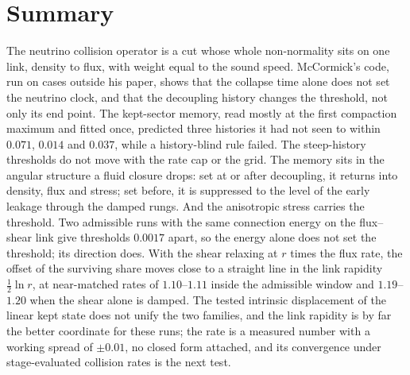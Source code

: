 \documentclass[11pt]{article}
\begin{document}
\section{Summary}

The neutrino collision operator is a cut whose whole non-normality sits on one link, density to flux, with weight equal to the sound speed. McCormick's code, run on cases outside his paper, shows that the collapse time alone does not set the neutrino clock, and that the decoupling history changes the threshold, not only its end point. The kept-sector memory, read mostly at the first compaction maximum and fitted once, predicted three histories it had not seen to within $0.071$, $0.014$ and $0.037$, while a history-blind rule failed. The steep-history thresholds do not move with the rate cap or the grid. The memory sits in the angular structure a fluid closure drops: set at or after decoupling, it returns into density, flux and stress; set before, it is suppressed to the level of the early leakage through the damped rungs. And the anisotropic stress carries the threshold. Two admissible runs with the same connection energy on the flux--shear link give thresholds $0.0017$ apart, so the energy alone does not set the threshold; its direction does. With the shear relaxing at $r$ times the flux rate, the offset of the surviving share moves close to a straight line in the link rapidity $\tfrac12\ln r$, at near-matched rates of $1.10$--$1.11$ inside the admissible window and $1.19$--$1.20$ when the shear alone is damped. The tested intrinsic displacement of the linear kept state does not unify the two families, and the link rapidity is by far the better coordinate for these runs; the rate is a measured number with a working spread of $\pm0.01$, no closed form attached, and its convergence under stage-evaluated collision rates is the next test.
\end{document}
